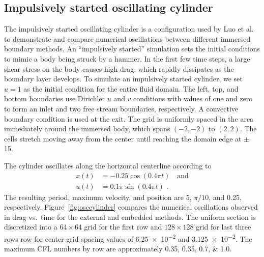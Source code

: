 \documentclass[preprint,12pt]{elsarticle}
\begin{document}
\subsection{Impulsively started oscillating cylinder}
\label{sec:osccylinder}

The impulsively started oscillating cylinder is a configuration used by Luo et
al.~\cite{Luo:2012gx} to demonstrate and compare numerical oscillations between different immersed boundary methods.
An ``impulsively started'' simulation sets the initial conditions to mimic a body being struck by a hammer.
In the first few time steps, a large shear stress on the body causes high drag,
which rapidly dissipates as the boundary layer develops. To simulate an impulsively started
cylinder, we set $u = 1$ as the initial condition for the entire fluid domain.
The left, top, and bottom boundaries use Dirichlet $u$ and $v$ conditions with values of
one and zero to form an inlet and two free stream boundaries, respectively.
A convective boundary condition is used at the exit.
The grid is uniformly spaced in the area immediately around the immersed body,
which spans $(-2,-2)$ to $(2,2)$. The cells stretch moving away from the center
until reaching the domain edge at $\pm$ 15.

The cylinder oscillates along the horizontal centerline according to
\begin{align}
    x(t) &= -0.25 \cos(0.4\pi t) \quad \text{and} \label{eq:cylinder position}\\
    u(t) &= 0.1\pi \sin(0.4\pi t) \;. \label{eq:cylinder velocity}
\end{align}
The resulting period, maximum velocity, and position are 5, $\pi/10$, and 0.25, respectively.
Figure~\ref{fig:osccylinder} compares the numerical oscillations observed in drag vs.~time
for the external and embedded methods. The uniform section is discretized into a
$64 \times 64$ grid for the first row and $ 128 \times 128$ grid for last three
rows row for center-grid spacing values of \num{6.25e-2} and \num{3.125e-2}.
The maximum CFL numbers by row are approximately \numlist{0.35; 0.35; 0.7; 1.0}.
\end{document}
